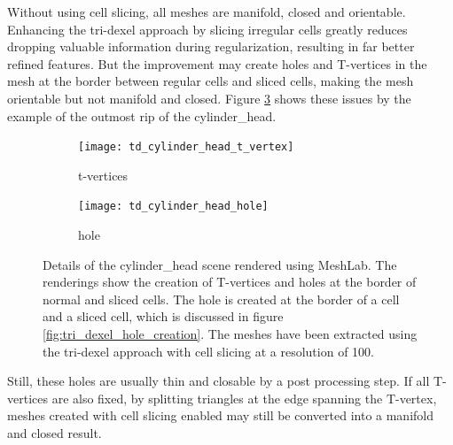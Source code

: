 Without using cell slicing, all meshes are manifold, closed and orientable.
Enhancing the tri-dexel approach by slicing irregular cells greatly reduces dropping valuable information during regularization, resulting in far better refined features.
But the improvement may create holes and T-vertices in the mesh at the border between regular cells and sliced cells, making the mesh orientable but not manifold and closed.
Figure \ref{fig:td_turbine_issues} shows these issues by the example of the outmost rip of the cylinder\_head.
%
\begin{figure}
	\centering
	\begin{subfigure}[b]{0.49\textwidth}
		\centering
		\texttt{[image: td\_cylinder\_head\_t\_vertex]}
		\caption{t-vertices}
		\label{fig:td_cylinder_head_t_vertex}
	\end{subfigure}
	\begin{subfigure}[b]{0.49\textwidth}
		\centering
		\texttt{[image: td\_cylinder\_head\_hole]}
		\caption{hole}
		\label{fig:td_cylinder_head_hole}
	\end{subfigure}
	\caption{
		Details of the cylinder\_head scene rendered using MeshLab.
		The renderings show the creation of T-vertices and holes at the border of normal and sliced cells.
		The hole is created at the border of a cell and a sliced cell, which is discussed in figure \ref{fig:tri_dexel_hole_creation}.
		The meshes have been extracted using the tri-dexel approach with cell slicing at a resolution of 100.
	}
	\label{fig:td_turbine_issues}
\end{figure}
%
Still, these holes are usually thin and closable by a post processing step.
If all T-vertices are also fixed, \eg by splitting triangles at the edge spanning the T-vertex, meshes created with cell slicing enabled may still be converted into a manifold and closed result.
